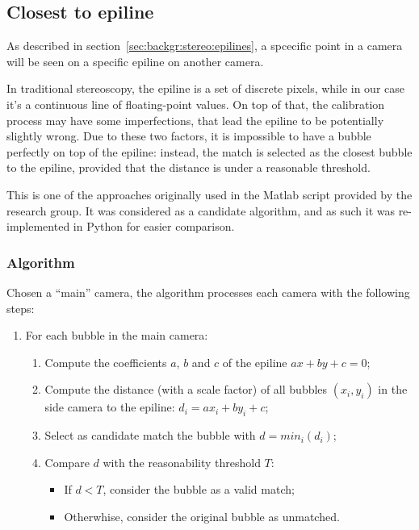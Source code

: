 \subsection{Closest to epiline}
\label{sec:match:epiline}

As described in section~\ref{sec:backgr:stereo:epilines}, a spcecific point in a camera will be seen on a specific epiline on another camera.

In traditional stereoscopy, the epiline is a set of discrete pixels, while in our case it's a continuous line of floating-point values.
On top of that, the calibration process may have some imperfections, that lead the epiline to be potentially slightly wrong.
Due to these two factors, it is impossible to have a bubble perfectly on top of the epiline: instead, the match is selected as the closest bubble to the epiline, provided that the distance is under a reasonable threshold.

This is one of the approaches originally used in the Matlab script provided by the research group.
It was considered as a candidate algorithm, and as such it was re-implemented in Python for easier comparison.

\subsubsection{Algorithm}

Chosen a ``main'' camera, the algorithm processes each camera with the following steps:
\begin{enumerate}
	\itemsep 0em
	\item For each bubble in the main camera:
	      \begin{enumerate}
		      \item Compute the coefficients $a$, $b$ and $c$ of the epiline $ax+by+c{=}0$;
		      \item Compute the distance (with a scale factor) of all bubbles $(x_i, y_i)$ in the side camera to the epiline: $d_i = ax_i + by_i + c$;
		      \item Select as candidate match the bubble with $d=min_i(d_i)$;
		      \item Compare $d$ with the reasonability threshold $T$:
		            \begin{itemize}
			            \item If $d<T$, consider the bubble as a valid match;
			            \item Otherwhise, consider the original bubble as unmatched.
		            \end{itemize}
	      \end{enumerate}
\end{enumerate}

